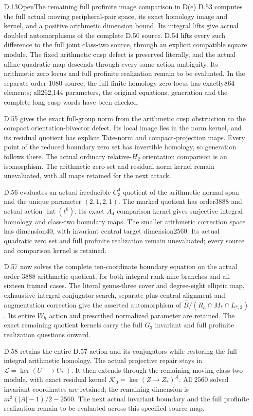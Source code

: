 \begin{statement}{D.13}{Open}{The remaining full profinite image comparison in D(e)}
D.53 computes the full actual moving peripheral-pair space,
its exact homology image and kernel, and a positive arithmetic
dimension bound. Its integral lifts give actual doubled
automorphisms of the complete D.50 source. D.54 lifts every
such difference to the full joint class-two source, through
an explicit compatible square module. The fixed arithmetic
cusp defect is preserved literally, and the actual affine
quadratic map descends through every same-action ambiguity.
Its arithmetic zero locus and full profinite realization
remain to be evaluated. In the separate order-1080 source,
the full finite homology zero locus has exactly864 elements;
all262,144 parameters, the original equations, generation
and the complete long cusp words have been checked.


D.55 gives the exact full-group norm from the arithmetic
cusp obstruction to the compact orientation-bivector defect.
Its local image lies in the norm kernel, and its residual
quotient has explicit Tate-norm and compact-projection maps.
Every point of the reduced boundary zero set has invertible
homology, so generation follows there. The actual ordinary
relative-$H_2$ orientation comparison is an isomorphism.
The arithmetic zero set and residual norm kernel remain
unevaluated, with all maps retained for the next attack.


D.56 evaluates an actual irreducible $C_3^4$ quotient of
the arithmetic normal span and the unique parameter $(2,1,2,1)$.
The marked quotient has order3888 and actual action
$\operatorname{Int}(t^6)$. Its exact $A_4$ comparison kernel
gives surjective integral homology and class-two boundary maps.
The smaller arithmetic correction space has dimension40,
with invariant central target dimension2560. Its actual
quadratic zero set and full profinite realization remain
unevaluated; every source and comparison kernel is retained.


D.57 now solves the complete ten-coordinate boundary equation
on the actual order-$3888$ arithmetic quotient, for both integral
rank-nine branches and all sixteen framed cases. The literal
genus-three cover and degree-eight elliptic map, exhaustive integral
conjugator search, separate plus-central alignment and augmentation
correction give the asserted automorphism of
$\widehat B/(R_h\cap M_*\cap L_{*,2})$.
Its entire $W_h$ action and prescribed normalized parameter are
retained. The exact remaining quotient kernels carry the full
$G_3$ invariant and full profinite realization questions onward.


D.58 retains the entire D.57 action and its conjugators while
restoring the full integral arithmetic homology. The actual
projective repair stays in
$\mathcal L=\ker(U^-\to U_*^-)$.
It then extends through the remaining moving class-two module,
with exact residual kernel
$\mathcal K_0=\ker(Z\to Z_*)^A$.
All $2560$ solved invariant coordinates are retained; the remaining
dimension is $m^2(|A|-1)/2-2560$.
The next actual invariant boundary and the full profinite realization
remain to be evaluated across this specified source map.
\end{statement}
